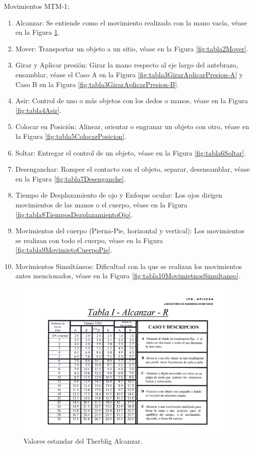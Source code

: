 Movimientos MTM-1:
\begin{enumerate}
    \item Alcanzar: Se entiende como el movimiento realizado con la mano vacía, véase en la Figura \ref{fig:tabla1Alcanzar}.
    \item Mover: Transportar un objeto a un sitio, véase en la Figura \ref{fig:tabla2Mover}. 
    \item Girar y Aplicar presión: Girar la mano respecto al eje largo del antebrazo, ensamblar, véase el Caso A en la Figura \ref{fig:tabla3GirarAplicarPresion-A} y Caso B en la Figura \ref{fig:tabla3GirarAplicarPresion-B}. 
    \item Asir: Control de uno o más objetos con los dedos o manos, véase en la Figura \ref{fig:tabla4Asir}. 
    \item Colocar en Posición: Alinear, orientar o engranar un objeto con otro, véase en la Figura \ref{fig:tabla5ColocarPosicion}. 
    \item Soltar: Entregar el control de un objeto, véase en la Figura \ref{fig:tabla6Soltar}. 
    \item Desenganchar: Romper el contacto con el objeto, separar, desensamblar, véase en la Figura \ref{fig:tabla7Desenganche}. 
    \item Tiempo de Desplazamiento de ojo y Enfoque ocular: Los ojos dirigen movimientos de las manos o el cuerpo, véase en la Figura \ref{fig:tabla8TiemposDezplazamientoOjo}. 
    \item Movimientos del cuerpo (Pierna-Pie, horizontal y vertical): Los movimientos se realizan con todo el cuerpo, véase en la Figura \ref{fig:tabla9MovimietoCuerpoPie}. 
    \item Movimientos Simultáneos: Dificultad con la que se realizan los movimientos antes mencionados, véase en la Figura \ref{fig:tabla10MovimietnosSimultaneo}. 
\end{enumerate}

\begin{figure}[H]
    \centering
    \includegraphics[scale=0.32]{15/img/tabla1Alcanzar.pdf}
    \caption{Valores estandar del Therblig Alcanzar.}
    \label{fig:tabla1Alcanzar}
\end{figure}


